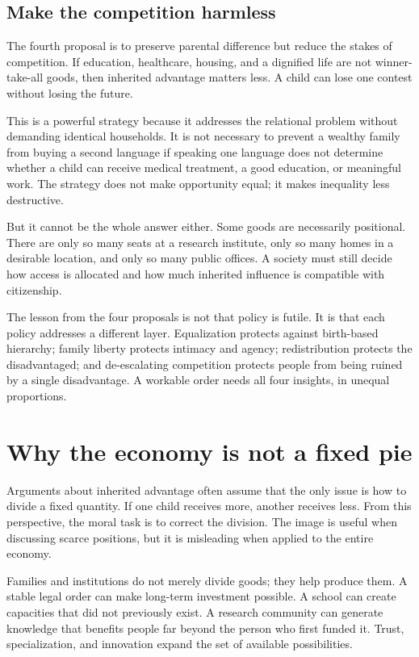 ﻿\documentclass[12pt,a4paper]{book}
\begin{document}
\subsection{Make the competition harmless}

The fourth proposal is to preserve parental difference but reduce the stakes
of competition.  If education, healthcare, housing, and a dignified life are
not winner-take-all goods, then inherited advantage matters less.  A child
can lose one contest without losing the future.

This is a powerful strategy because it addresses the relational problem
without demanding identical households.  It is not necessary to prevent a
wealthy family from buying a second language if speaking one language does
not determine whether a child can receive medical treatment, a good
education, or meaningful work.  The strategy does not make opportunity
equal; it makes inequality less destructive.

But it cannot be the whole answer either.  Some goods are necessarily
positional.  There are only so many seats at a research institute, only so
many homes in a desirable location, and only so many public offices.  A
society must still decide how access is allocated and how much inherited
influence is compatible with citizenship.

The lesson from the four proposals is not that policy is futile.  It is that
each policy addresses a different layer.  Equalization protects against
birth-based hierarchy; family liberty protects intimacy and agency;
redistribution protects the disadvantaged; and de-escalating competition
protects people from being ruined by a single disadvantage.  A workable
order needs all four insights, in unequal proportions.

\section{Why the economy is not a fixed pie}

Arguments about inherited advantage often assume that the only issue is how
to divide a fixed quantity.  If one child receives more, another receives
less.  From this perspective, the moral task is to correct the division.
The image is useful when discussing scarce positions, but it is misleading
when applied to the entire economy.

Families and institutions do not merely divide goods; they help produce
them.  A stable legal order can make long-term investment possible.  A
school can create capacities that did not previously exist.  A research
community can generate knowledge that benefits people far beyond the person
who first funded it.  Trust, specialization, and innovation expand the set
of available possibilities.
\end{document}
